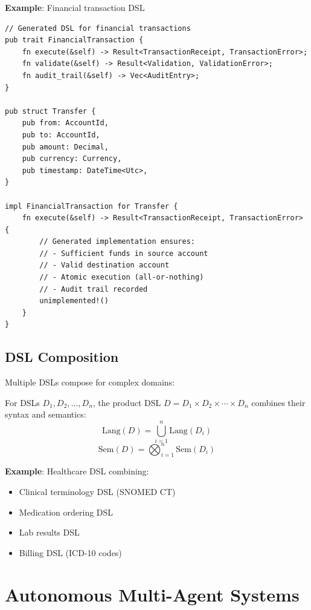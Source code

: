 \textbf{Example}: Financial transaction DSL

\begin{verbatim}
// Generated DSL for financial transactions
pub trait FinancialTransaction {
    fn execute(&self) -> Result<TransactionReceipt, TransactionError>;
    fn validate(&self) -> Result<Validation, ValidationError>;
    fn audit_trail(&self) -> Vec<AuditEntry>;
}

pub struct Transfer {
    pub from: AccountId,
    pub to: AccountId,
    pub amount: Decimal,
    pub currency: Currency,
    pub timestamp: DateTime<Utc>,
}

impl FinancialTransaction for Transfer {
    fn execute(&self) -> Result<TransactionReceipt, TransactionError> {
        // Generated implementation ensures:
        // - Sufficient funds in source account
        // - Valid destination account
        // - Atomic execution (all-or-nothing)
        // - Audit trail recorded
        unimplemented!()
    }
}
\end{verbatim}

\subsection{DSL Composition}

Multiple DSLs compose for complex domains:

\begin{definition}
    For DSLs $D_1, D_2, \ldots, D_n$, the product DSL $D = D_1 \times D_2 \times \cdots \times D_n$ combines their syntax and semantics:
    \begin{equation}
        \text{Lang}(D) = \bigcup_{i=1}^{n} \text{Lang}(D_i)
    \end{equation}
    \begin{equation}
        \text{Sem}(D) = \bigotimes_{i=1}^{n} \text{Sem}(D_i)
    \end{equation}
\end{definition}

\textbf{Example}: Healthcare DSL combining:
\begin{itemize}
    \item Clinical terminology DSL (SNOMED CT)
    \item Medication ordering DSL
    \item Lab results DSL
    \item Billing DSL (ICD-10 codes)
\end{itemize}

\section{Autonomous Multi-Agent Systems}

